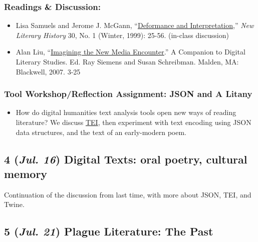 \documentclass[11pt]{article}
\begin{document}
\subsubsection*{Readings \& Discussion:}
\label{sec:org54ad689}
\begin{itemize}
\item Lisa Samuels and Jerome J. McGann, “\href{http://bf4dv7zn3u.search.serialssolutions.com.myaccess.library.utoronto.ca/?ctx\_ver=Z39.88-2004\&ctx\_enc=info\%253Aofi\%252Fenc\%253AUTF-8\&rfr\_id=info\%253Asid\%252Fsummon.serialssolutions.com\&rft\_val\_fmt=info\%253Aofi\%252Ffmt\%253Akev\%253Amtx\%253Ajournal\&rft.genre=article\&rft.atitle=Deformance+and+Interpretation\&rft.jtitle=New+Literary+History\%253A+a+journal+of+theory+and+interpretation\&rft.au=Samuels\%252C+Lisa\&rft.au=McGann\%252C+Jerome\&rft.date=1999\&rft.issn=0028-6087\&rft.eissn=1080-661X\&rft.volume=30\&rft.issue=1\&rft.spage=25\&rft.externalDocID=R03182533}{Deformance and Interpretation},” \emph{New Literary History} 30, No. 1 (Winter, 1999): 25-56. (in-class discussion)
\item Alan Liu, “\href{http://www.digitalhumanities.org/companion/view?docId=blackwell/9781405148641/9781405148641.xml\&chunk.id=ss1-3-1\&toc.depth=1\&toc.id=ss1-3-1\&brand=9781405148641\_brand}{Imagining the New Media Encounter}.” A Companion to Digital Literary Studies. Ed. Ray Siemens and Susan Schreibman. Malden, MA: Blackwell, 2007. 3-25
\end{itemize}
\subsubsection*{Tool Workshop/Reflection Assignment: JSON and A Litany}
\label{sec:org39b6c91}
\begin{itemize}
\item How do digital humanities text analysis tools open new ways of reading literature? We discuss  \href{https://tei-c.org/}{TEI}, then experiment with text encoding using JSON data structures, and the text of an early-modern poem.
\end{itemize}
\subsection*{4 (\textit{Jul. 16}) Digital Texts: oral poetry, cultural memory}
\label{sec:org6201e0b}
Continuation of the discussion from last time, with more about JSON, TEI, and Twine. 
\subsection*{5 (\textit{Jul. 21}) Plague Literature: The Past}
\label{sec:org01811be}
\end{document}
